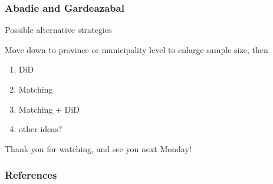 \documentclass[12pt,english,dvipsnames,aspectratio=169,handout]{beamer}\usepackage[]{graphicx}\usepackage[]{xcolor}
\begin{document}
\begin{frame}
	\frametitle{Abadie and Gardeazabal \citeyear{abadie_economic_2003}}
	Possible alternative strategies
	
	Move down to province or municipality level to enlarge sample size, then 
	\begin{enumerate}
		\item DiD
		\item Matching
		\item Matching + DiD
		\item other ideas?
	\end{enumerate}
\end{frame}


\begin{frame}
\begin{center}
    \LARGE Thank you for watching, and see you next Monday!
\end{center}
\end{frame}


\begin{frame}[allowframebreaks]
\frametitle{References}

\scriptsize
\end{frame}
\end{document}
